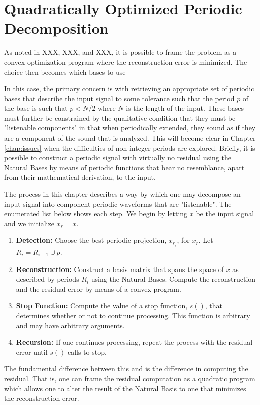 \chapter{Quadratically Optimized Periodic Decomposition}\label{chap:detection}

As noted in XXX, XXX, and XXX, it is possible to frame the problem as a convex optimization program where the reconstruction error is minimized. The choice then becomes which bases to use



In this case, the primary concern is with retrieving an appropriate set of periodic bases that describe the input signal to some tolerance such that the period $p$ of the base is such that $p < N/2$ where $N$ is the length of the input. These bases must further be constrained by the qualitative condition that they must be "listenable components" in that when periodically extended, they sound as if they are a component of the sound that is analyzed. This will become clear in Chapter \ref{chap:issues} when the difficulties of non-integer periods are explored. Briefly, it is possible to construct a periodic signal with virtually no residual using the Natural Bases by means of periodic functions that bear no resemblance, apart from their mathematical derivation, to the input.

The process in this chapter describes a way by which one may decompose an input signal into component periodic waveforms that are "listenable". The enumerated list below shows each step. We begin by letting $x$ be the input signal and we initialize $x_r = x$.
\begin{enumerate}
    \item\textbf{Detection:} Choose the best periodic projection, $x_{r_{_p}}$, for $x_r$. Let $R_i = R_{i-1} \cup p$.
    \item\textbf{Reconstruction:} Construct a basis matrix that spans the space of $x$ as described by periods $R_i$ using the Natural Bases. Compute the reconstruction and the residual error by means of a convex program.
    \item\textbf{Stop Function:} Compute the value of a stop function, $s()$, that determines whether or not to continue processing. This function is arbitrary and may have arbitrary arguments.
    \item\textbf{Recursion:} If one continues processing, repeat the process with the residual error until $s()$ calls to stop.
\end{enumerate}
The fundamental difference between this and \cite{sethares1999periodicity} is the difference in computing the residual. That is, one can frame the residual computation as a quadratic program which allows one to alter the result of the Natural Basis to one that minimizes the reconstruction error.

